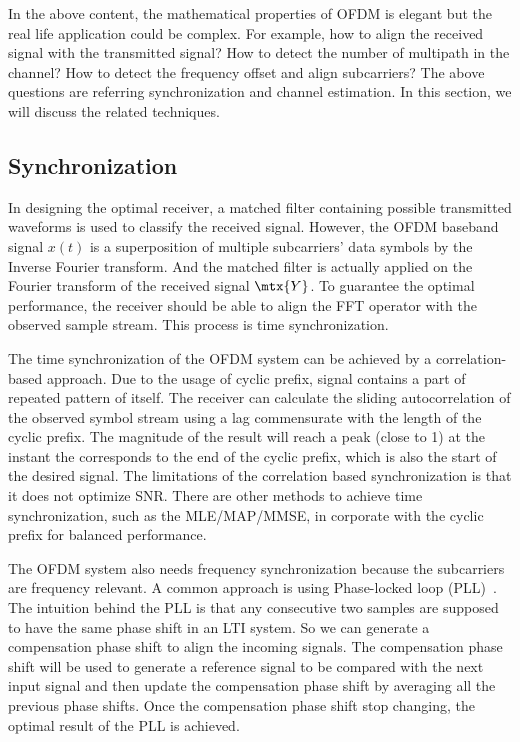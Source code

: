 In the above content, the mathematical properties of OFDM is elegant but the real life application could be complex. For example, how to align the received signal with the transmitted signal? How to detect the number of multipath in the channel? How to detect the frequency offset and align subcarriers? The above questions are referring synchronization and channel estimation. In this section, we will discuss the related techniques.

\subsection{Synchronization}
In designing the optimal receiver, a matched filter containing possible transmitted waveforms is used to classify the received signal. However, the OFDM baseband signal $x(t)$ is a superposition of multiple subcarriers' data symbols by the Inverse Fourier transform. And the matched filter is actually applied on the Fourier transform of the received signal $\mtx{Y}$. To guarantee the optimal performance, the receiver should be able to align the FFT operator with the observed sample stream. This process is time synchronization.

The time synchronization of the OFDM system can be achieved by a correlation-based approach. Due to the usage of cyclic prefix, signal contains a part of repeated pattern of itself. The receiver can calculate the sliding autocorrelation of the observed symbol stream using a lag commensurate with the length of the cyclic prefix. The magnitude of the result will reach a peak (close to 1) at the instant the corresponds to the end of the cyclic prefix, which is also the start of the desired signal. The limitations of the correlation based synchronization is that it does not optimize SNR. There are other methods to achieve time synchronization, such as the MLE/MAP/MMSE, \etc in corporate with the cyclic prefix for balanced performance.


The OFDM system also needs frequency synchronization because the subcarriers are frequency relevant. A common approach is using Phase-locked loop (PLL)~\cite{ContributorstoWikimediaprojects2024Mar}. The intuition behind the PLL is that any consecutive two samples are supposed to have the same phase shift in an LTI system. So we can generate a compensation phase shift to align the incoming signals. The compensation phase shift will be used to generate a reference signal to be compared with the next input signal and then update the compensation phase shift by averaging all the previous phase shifts. Once the compensation phase shift stop changing, the optimal result of the PLL is achieved.

